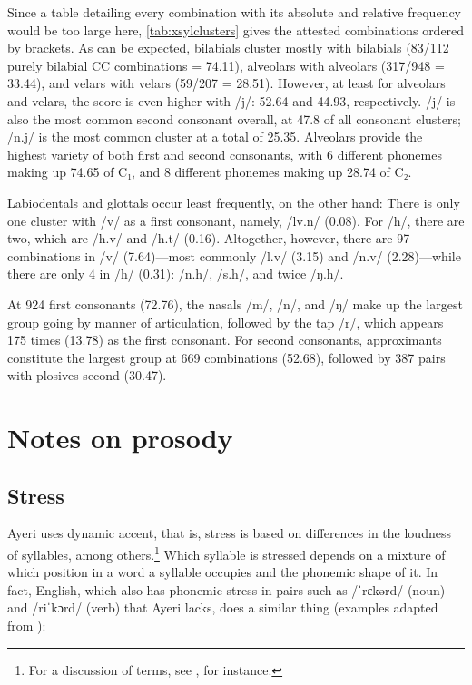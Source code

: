 Since a table detailing every combination with its absolute and relative 
frequency would be too large here, \autoref{tab:xsylclusters} gives the 
attested combinations ordered by brackets. As can be expected, bilabials 
cluster mostly with bilabials (83/112 purely bilabial CC combinations = 
74.11\pct), alveolars with alveolars (317/948 = 33.44\pct), and velars with 
velars (59/207 = 28.51\pct). However, at least for alveolars and velars, 
the score is even higher with /j/: 52.64\pct{} and 44.93\pct{}, respectively. 
/j/ is also the most common second consonant overall, at 47.8\pct{} of all 
consonant clusters; /n.j/ is the most common cluster at a total of 25.35\pct{}. 
Alveolars provide the highest variety of both first and second consonants, with 
6 different phonemes making up 74.65\pct{} of C₁, and 8 different phonemes 
making up 28.74\pct{} of C₂.

Labiodentals and glottals occur least frequently, on the other hand: There is 
only one cluster with /v/ as a first consonant, namely, /lv.n/ (0.08\pct). 
For /h/, there are two, which are /h.v/ and /h.t/ (0.16\pct). Altogether, 
however, there are 97 combinations in /v/ (7.64\pct)---most commonly /l.v/ 
(3.15\pct) and /n.v/ (2.28\pct)---while there are only 4 in /h/ (0.31\pct): 
/n.h/, /s.h/, and twice /ŋ.h/.

At 924 first consonants (72.76\pct), the nasals /m/, /n/, and /ŋ/ make up the 
largest group going by manner of articulation, followed by the tap /r/, which 
appears 175 times (13.78\pct) as the first consonant. For second consonants, 
approximants constitute the largest group at 669 combinations (52.68\pct), 
followed by 387 pairs with plosives second (30.47\pct).
%

\section{Notes on prosody}

\subsection{Stress}

Ayeri uses dynamic accent, that is, stress is based on differences in the 
loudness of syllables, among others.\footnote{For a discussion of terms, see 
\citet{kager2007}, for instance.} Which syllable is stressed depends on a 
mixture of which position in a word a syllable occupies and the phonemic shape 
of it. In fact, English, which also has phonemic stress in pairs such as 
 /ˈrɛkərd/ (noun) and /riˈkɔrd/ (verb) that Ayeri lacks, does a 
similar thing (examples adapted from \cite[552]{halle1998}):

